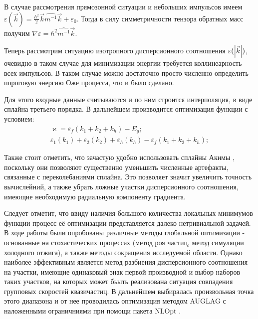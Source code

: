 \documentclass[../main.tex]{subfiles}
\begin{document}
        В случае рассмотрения
                прямозонной ситуации и небольших импульсов имеем 
                    $\varepsilon (\vec k) = \frac{\hbar^2}{2} \vec k \widehat{m^{-1}} \vec k + \varepsilon_0$.
                Тогда в силу симметричности тензора обратных масс получим $\nabla \varepsilon = \hbar^2 \widehat{m^{-1}} \vec k$.

        Теперь рассмотрим ситуацию изотропного дисперсионного соотношения $\varepsilon(\abs{\vec k})$,
        очевидно в таком случае для минимизации энергии требуется коллинеарность всех импульсов. 
        В таком случае можно достаточно просто численно определить пороговую энергию Оже процесса, что и было сделано.

        Для этого входные данные считываются и по ним строится интерполяция,
        в виде сплайна третьего порядка. В дальнейшем производится оптимизация функции с условием:
        \begin{eqnarray}
            \varkappa  = \varepsilon_f(k_1 + k_2 + k_h) - E_g;\\
            \varepsilon_1(k_1) + \varepsilon_2(k_2) + \varepsilon_h(k_h) - \varepsilon_f(k_1 + k_2 + k_h);
        \end{eqnarray}

        Также стоит отметить, что зачастую удобно использовать сплайны Акимы \cite{AkimaSplines}, поскольку они позволяют существенно уменьшить
        численные артефакты, связанные с переколебаниями сплайна. Это позволяет значит увеличить точность вычислейний, а также убрать ложные
        участки дисперсионного соотношения, имеющие необходимую радиальную компоненту градиента.

        Следует отметит, что ввиду наличия большого количества локальных минимумов функции процесс её оптимизации представляется далеко нетривиальной задачей.
        В ходе работы были опробованы различные методы глобальной оптимизации - основанные на стохастических процессах (метод роя частиц, метод 
        симуляции холодного отжига), а также методы сокращения исследуемой области. Однако наиболее эффективным является метод разбиения 
        дисперсионного соотношения на участки, имеющие одинаковый знак первой производной и выбор наборов таких участков,
        на которых может бьыть реализована ситуация совпадения групповых скоростей квазичастиц. В дальнейшем выбиралась произвольная точка этого диапазона
        и от нее проводилась оптимизация методом AUGLAG \cite{AuglagOptim} с наложенными ограничниями при помощи пакета NLOpt \cite{NLopt}.
\end{document}
